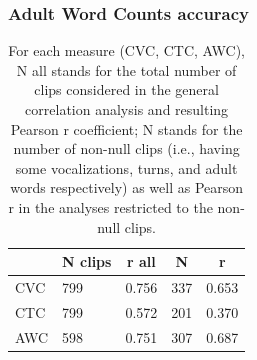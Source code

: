 \documentclass[english,table,man,floatsintext]{apa6}
\begin{document}
\hypertarget{adult-word-counts-accuracy}{%
\subsubsection{Adult Word Counts accuracy}\label{adult-word-counts-accuracy}}

\begin{table}[tbp]

\begin{center}
\begin{threeparttable}

\caption{\label{tab:tabrs}For each measure (CVC, CTC, AWC), N all stands for the total number of clips considered in the general correlation analysis and resulting Pearson r coefficient; N stands for the number of non-null clips (i.e., having some vocalizations, turns, and adult words respectively) as well as Pearson r in the analyses restricted to the non-null clips.}

\begin{tabular}{lllll}
\toprule
 & \multicolumn{1}{c}{N clips} & \multicolumn{1}{c}{r all} & \multicolumn{1}{c}{N} & \multicolumn{1}{c}{r}\\
\midrule
CVC & 799 & 0.756 & 337 & 0.653\\
CTC & 799 & 0.572 & 201 & 0.370\\
AWC & 598 & 0.751 & 307 & 0.687\\
\bottomrule
\end{tabular}

\end{threeparttable}
\end{center}

\end{table}
\end{document}
